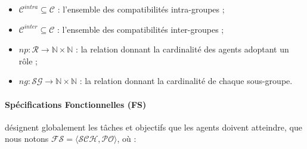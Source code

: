 \documentclass[sigconf,anonymous]{aamas}
\begin{document}
\begin{itemize}
\begin{itemize}
              \item $\mathcal{C}^{intra} \subseteq \mathcal{C}$ : l'ensemble des compatibilités intra-groupes ;
              \item $\mathcal{C}^{inter} \subseteq \mathcal{C}$ : l'ensemble des compatibilités inter-groupes ;
              \item $np : \mathcal{R} \rightarrow \mathbb{N} \times \mathbb{N}$ : la relation donnant la cardinalité des agents adoptant un rôle ;
              \item $ng : \mathcal{SG} \rightarrow \mathbb{N} \times \mathbb{N}$ : la relation donnant la cardinalité de chaque sous-groupe.
          \end{itemize}
\end{itemize}

\paragraph{\textbf{Spécifications Fonctionnelles (FS)}} désignent globalement les tâches et objectifs que les agents doivent atteindre, que nous notons $\mathcal{FS} = \langle \mathcal{SCH}, \mathcal{PO} \rangle$, où :
\end{document}
